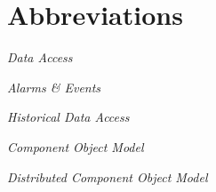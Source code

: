 % 

\chapter*{Abbreviations}
\label{sec:abbreviations}
\noindent\vspace{-\topsep-\partopsep-\parsep} %
\begin{description}[labelwidth=*]
  \item [DA] \emph{Data Access}%
  \item [A\&E] \emph{Alarms \& Events}%
  \item [HDA] \emph{Historical Data Access}%
  \item [COM] \emph{ Component Object Model }%
  \item [DCOM] \emph{Distributed Component Object Model}%
\end{description}